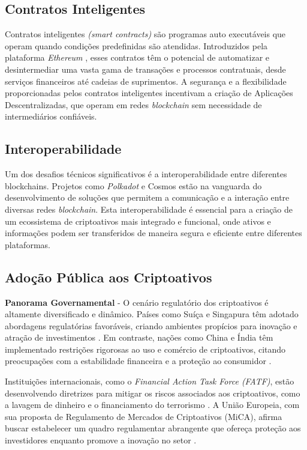 \documentclass[article,12pt,oneside,a4paper,english,brazil]{unifil}
\begin{document}
\begin{Spacing}{1.5}
\subsection*{Contratos Inteligentes}

Contratos inteligentes \textit{(smart contracts)} são programas auto executáveis que operam quando condições predefinidas são atendidas. Introduzidos pela plataforma \textit{Ethereum} \cite{buterin2013ethereum}, esses contratos têm o potencial de automatizar e desintermediar uma vasta gama de transações e processos contratuais, desde serviços financeiros até cadeias de suprimentos. A segurança e a flexibilidade proporcionadas pelos contratos inteligentes incentivam a criação de Aplicações Descentralizadas, que operam em redes \textit{blockchain} sem necessidade de intermediários confiáveis.

\subsection*{Interoperabilidade}

Um dos desafios técnicos significativos é a interoperabilidade entre diferentes blockchains. Projetos como \textit{Polkadot} \cite{wood2016polkadot} e Cosmos \cite{kwon2016cosmos} estão na vanguarda do desenvolvimento de soluções que permitem a comunicação e a interação entre diversas redes \textit{blockchain}. Esta interoperabilidade é essencial para a criação de um ecossistema de criptoativos mais integrado e funcional, onde ativos e informações podem ser transferidos de maneira segura e eficiente entre diferentes plataformas.

\subsection*{Adoção Pública aos Criptoativos}

\textbf{Panorama Governamental} - O cenário regulatório dos criptoativos é altamente diversificado e dinâmico. Países como Suíça e Singapura têm adotado abordagens regulatórias favoráveis, criando ambientes propícios para inovação e atração de investimentos \cite{zohar2015bitcoin}. Em contraste, nações como China e Índia têm implementado restrições rigorosas ao uso e comércio de criptoativos, citando preocupações com a estabilidade financeira e a proteção ao consumidor \cite{auer2018regulating}.

Instituições internacionais, como o \textit{Financial Action Task Force (FATF)}, estão desenvolvendo diretrizes para mitigar os riscos associados aos criptoativos, como a lavagem de dinheiro e o financiamento do terrorismo \cite{fatf2019guidance}. A União Europeia, com sua proposta de Regulamento de Mercados de Criptoativos (MiCA), afirma buscar estabelecer um quadro regulamentar abrangente que ofereça proteção aos investidores enquanto promove a inovação no setor \cite{european2020proposal}.


\end{Spacing}
\end{document}
